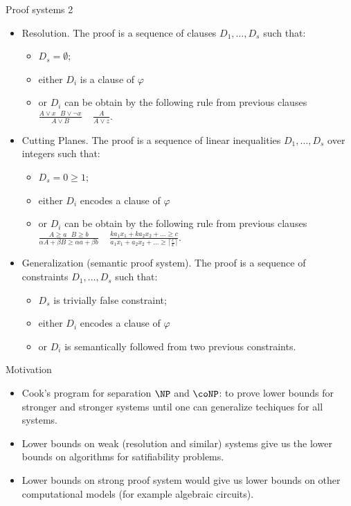 \begin{frame}{Proof systems 2}
    \begin{itemize}
        \item Resolution. The proof is a sequence of clauses $D_1, \dots, D_s$ such that:
            \begin{itemize}
                \item $D_s = \emptyset$;
                \item either $D_i$ is a clause of $\varphi$
                \item or $D_i$ can be obtain by the following rule from previous clauses $\frac{A \lor x ~~~ B \lor \neg x}{A
                    \lor B} ~~~~~ \frac{A}{A \lor z}$.
            \end{itemize}
        \pause
        \item Cutting Planes. The proof is a sequence of linear inequalities $D_1, \dots, D_s$ over integers such that:
            \begin{itemize}
                \item $D_s = 0 \ge 1$;
                \item either $D_i$ encodes a clause of $\varphi$
                \item or $D_i$ can be obtain by the following rule from previous clauses $\frac{A \ge a ~~~ B \ge b}{\alpha A
                    + \beta B \ge \alpha a + \beta b} ~~~~~ \frac{ka_1 x_1 + ka_2 x_2 + \dots \ge c}{a_1 x_1 + a_2 x_2 +
                    \dots \ge \lceil \frac{c}{k} \rceil}$.
            \end{itemize}
        \pause
        \item Generalization (semantic proof system). The proof is a sequence of constraints $D_1, \dots, D_s$ such that:
            \begin{itemize}
                \item $D_s$ is trivially false constraint;
                \item either $D_i$ encodes a clause of $\varphi$
                \item or $D_i$ is semantically followed from two previous constraints.
            \end{itemize}
    \end{itemize}
\end{frame}


\begin{frame}{Motivation}
    \begin{itemize}
        \item Cook's program for separation $\NP$ and $\coNP$: to prove lower bounds for {\color{blue}
            stronger and stronger} systems until one can generalize techiques for all systems.
        \pause
        \item Lower bounds on {\color{blue} weak} (resolution and similar) systems give us the lower
            bounds on algorithms for satifiability problems.
        \pause
        \item Lower bounds on {\color{blue} strong} proof system would give us lower bounds on other
            computational models (for example algebraic circuits).
    \end{itemize}
\end{frame}